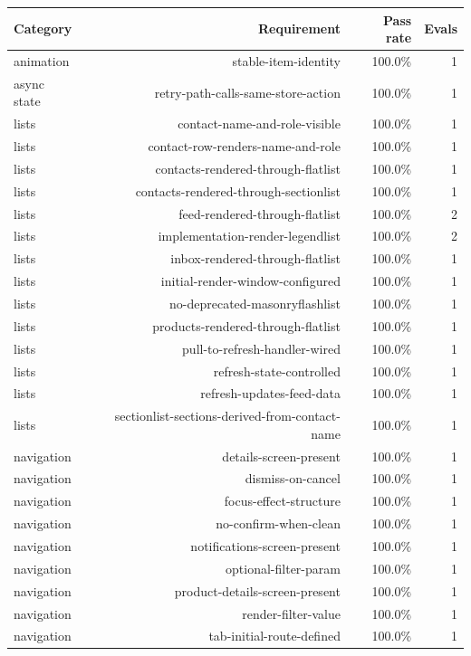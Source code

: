 \begin{table}[htbp]
\centering
\begin{tabular}{lrrr}
\toprule
Category & Requirement & Pass rate & Evals \\
\midrule
animation & stable-item-identity & 100.0\% & 1 \\
async state & retry-path-calls-same-store-action & 100.0\% & 1 \\
lists & contact-name-and-role-visible & 100.0\% & 1 \\
lists & contact-row-renders-name-and-role & 100.0\% & 1 \\
lists & contacts-rendered-through-flatlist & 100.0\% & 1 \\
lists & contacts-rendered-through-sectionlist & 100.0\% & 1 \\
lists & feed-rendered-through-flatlist & 100.0\% & 2 \\
lists & implementation-render-legendlist & 100.0\% & 2 \\
lists & inbox-rendered-through-flatlist & 100.0\% & 1 \\
lists & initial-render-window-configured & 100.0\% & 1 \\
lists & no-deprecated-masonryflashlist & 100.0\% & 1 \\
lists & products-rendered-through-flatlist & 100.0\% & 1 \\
lists & pull-to-refresh-handler-wired & 100.0\% & 1 \\
lists & refresh-state-controlled & 100.0\% & 1 \\
lists & refresh-updates-feed-data & 100.0\% & 1 \\
lists & sectionlist-sections-derived-from-contact-name & 100.0\% & 1 \\
navigation & details-screen-present & 100.0\% & 1 \\
navigation & dismiss-on-cancel & 100.0\% & 1 \\
navigation & focus-effect-structure & 100.0\% & 1 \\
navigation & no-confirm-when-clean & 100.0\% & 1 \\
navigation & notifications-screen-present & 100.0\% & 1 \\
navigation & optional-filter-param & 100.0\% & 1 \\
navigation & product-details-screen-present & 100.0\% & 1 \\
navigation & render-filter-value & 100.0\% & 1 \\
navigation & tab-initial-route-defined & 100.0\% & 1 \\

\end{tabular}
\end{table}
